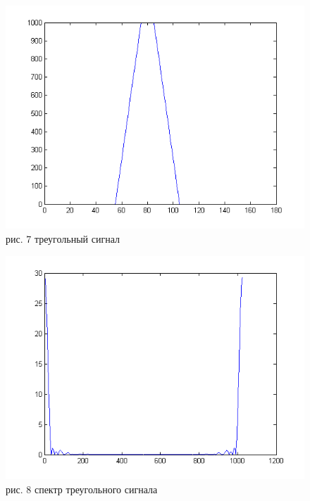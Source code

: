 \documentclass[10pt,a4paper]{report}
\begin{document}
\begin{figure}
\begin{center}
\includegraphics[angle=0, scale = 0.9]{5.png}\newline
рис. 7  треугольный сигнал\newline
\end{center}
\end{figure}
\begin{figure}
\begin{center}
\includegraphics[angle=0, scale = 1.1]{6.png}\newline
рис. 8 спектр треугольного сигнала \newline
\end{center}
\end{figure}
\end{document}
